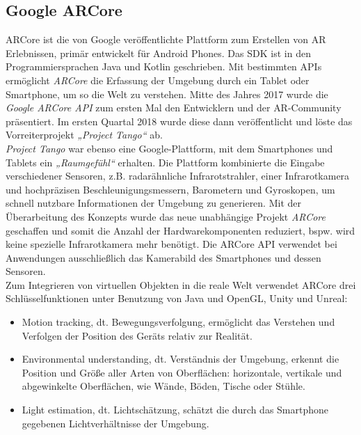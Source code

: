 \subsection{Google ARCore}
\label{sec:arcore}
ARCore ist die von Google veröffentlichte Plattform zum Erstellen von \acl{AR} Erlebnissen, primär entwickelt für Android Phones. 
Das \ac{SDK} ist in den Programmiersprachen Java und Kotlin geschrieben. Mit bestimmten \acs{API}s ermöglicht \textit{ARCore} die Erfassung 
der Umgebung durch ein Tablet oder Smartphone, um so die Welt zu verstehen. Mitte des Jahres 2017 
wurde die \textit{Google ARCore API} zum ersten Mal den Entwicklern und der \acs{AR}-Community präsentiert. Im ersten Quartal 2018 wurde 
diese dann veröffentlicht und löste das Vorreiterprojekt \textit{„Project Tango“} ab. 
\\ 
\linebreak 
\textit{Project Tango} war ebenso eine Google-Plattform, mit dem Smartphones und Tablets ein \textit{„Raumgefühl“} erhalten. \cite{projecttango.2016j} 
Die Plattform kombinierte die Eingabe verschiedener Sensoren, z.B. radarähnliche Infrarotstrahler, einer Infrarotkamera und hochpräzisen 
Beschleunigungsmessern, Barometern und Gyroskopen, um schnell nutzbare Informationen der Umgebung zu generieren. Mit der Überarbeitung des 
Konzepts wurde das neue unabhängige Projekt \textit{ARCore} geschaffen und somit die Anzahl der Hardwarekomponenten reduziert, bspw. wird 
keine spezielle Infrarotkamera mehr benötigt. Die ARCore \acs{API} verwendet bei Anwendungen ausschließlich das Kamerabild des Smartphones und 
dessen Sensoren. 
\\ 
\linebreak 
Zum Integrieren von virtuellen Objekten in die reale Welt verwendet ARCore drei Schlüsselfunktionen unter Benutzung von Java und OpenGL, Unity 
und Unreal:
\begin{itemize}
    \item Motion tracking, dt. Bewegungsverfolgung, ermöglicht das Verstehen und Verfolgen der Position des Geräts relativ zur Realität.
    \item Environmental understanding, dt. Verständnis der Umgebung, erkennt die Position und Größe aller Arten von Oberflächen: horizontale, 
    vertikale und abgewinkelte Oberflächen, wie Wände, Böden, Tische oder Stühle.
    \item Light estimation, dt. Lichtschätzung, schätzt die durch das Smartphone gegebenen Lichtverhältnisse der Umgebung. \cite{arcorefundamentals.2018m}
\end{itemize}
